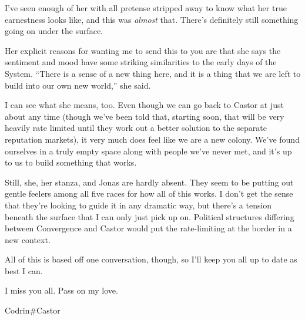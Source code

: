 I've seen enough of her with all pretense stripped away to know what her true earnestness looks like, and this was \emph{almost} that. There's definitely still something going on under the surface.

Her explicit reasons for wanting me to send this to you are that she says the sentiment and mood have some striking similarities to the early days of the System. ``There is a sense of a new thing here, and it is a thing that we are left to build into our own new world,'' she said.

I can see what she means, too. Even though we can go back to Castor at just about any time (though we've been told that, starting soon, that will be very heavily rate limited until they work out a better solution to the separate reputation markets), it very much does feel like we are a new colony. We've found ourselves in a truly empty space along with people we've never met, and it's up to us to build something that works.

Still, she, her stanza, and Jonas are hardly absent. They seem to be putting out gentle feelers among all five races for how all of this works. I don't get the sense that they're looking to guide it in any dramatic way, but there's a tension beneath the surface that I can only just pick up on. Political structures differing between Convergence and Castor would put the rate-limiting at the border in a new context.

All of this is based off one conversation, though, so I'll keep you all up to date as best I can.

I miss you all. Pass on my love.

Codrin\#Castor
